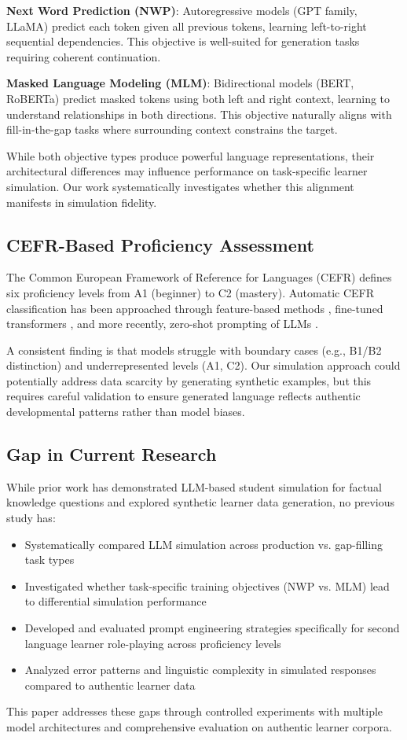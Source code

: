 \textbf{Next Word Prediction (NWP)}: Autoregressive models (GPT family, LLaMA) predict each token given all previous tokens, learning left-to-right sequential dependencies. This objective is well-suited for generation tasks requiring coherent continuation.

\textbf{Masked Language Modeling (MLM)}: Bidirectional models (BERT, RoBERTa) predict masked tokens using both left and right context, learning to understand relationships in both directions. This objective naturally aligns with fill-in-the-gap tasks where surrounding context constrains the target.

While both objective types produce powerful language representations, their architectural differences may influence performance on task-specific learner simulation. Our work systematically investigates whether this alignment manifests in simulation fidelity.

\subsection{CEFR-Based Proficiency Assessment}

The Common European Framework of Reference for Languages (CEFR) defines six proficiency levels from A1 (beginner) to C2 (mastery). Automatic CEFR classification has been approached through feature-based methods \cite{kerz2021automated}, fine-tuned transformers \cite{mayfield2020fine}, and more recently, zero-shot prompting of LLMs \cite{benedetto2025llm}.

A consistent finding is that models struggle with boundary cases (e.g., B1/B2 distinction) and underrepresented levels (A1, C2). Our simulation approach could potentially address data scarcity by generating synthetic examples, but this requires careful validation to ensure generated language reflects authentic developmental patterns rather than model biases.

\subsection{Gap in Current Research}

While prior work has demonstrated LLM-based student simulation for factual knowledge questions and explored synthetic learner data generation, no previous study has:

\begin{itemize}
    \item Systematically compared LLM simulation across production vs. gap-filling task types
    \item Investigated whether task-specific training objectives (NWP vs. MLM) lead to differential simulation performance
    \item Developed and evaluated prompt engineering strategies specifically for second language learner role-playing across proficiency levels
    \item Analyzed error patterns and linguistic complexity in simulated responses compared to authentic learner data
\end{itemize}

This paper addresses these gaps through controlled experiments with multiple model architectures and comprehensive evaluation on authentic learner corpora.
